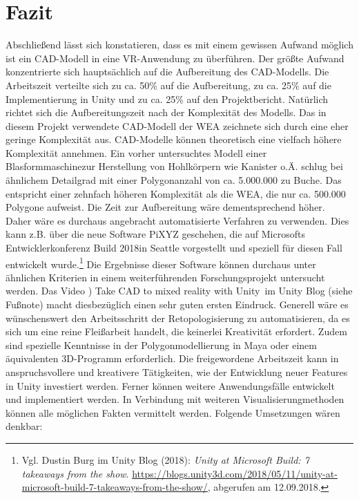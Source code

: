 \chapter{Fazit}
\label{sec:Fazit}

Abschließend lässt sich konstatieren, dass es mit einem gewissen Aufwand möglich ist ein CAD-Modell in eine VR-Anwendung zu überführen. Der größte Aufwand konzentrierte sich hauptsächlich auf die Aufbereitung des CAD-Modells. Die Arbeitszeit verteilte sich zu ca. 50\% auf die Aufbereitung, zu ca. 25\% auf die Implementierung in Unity und zu ca. 25\% auf den Projektbericht. Natürlich richtet sich die Aufbereitungszeit nach der Komplexität des Modells. Das in diesem Projekt verwendete CAD-Modell der WEA zeichnete sich durch eine eher geringe Komplexität aus. CAD-Modelle können theoretisch eine vielfach höhere Komplexität annehmen. 
Ein vorher untersuchtes Modell einer \glqq Blasformmaschine\grqq zur Herstellung von Hohlkörpern wie Kanister o.Ä. schlug bei ähnlichem Detailgrad mit einer Polygonanzahl von ca. 5.000.000 zu Buche. Das entspricht einer zehnfach höheren Komplexität als die WEA, die nur ca. 500.000 Polygone aufweist. Die Zeit zur Aufbereitung wäre dementsprechend höher. Daher wäre es durchaus angebracht automatisierte Verfahren zu verwenden. Dies kann z.B. über die neue Software PiXYZ geschehen, die auf Microsofts Entwicklerkonferenz \glqq Build 2018\grqq in Seattle vorgestellt und speziell für diesen Fall entwickelt wurde.\footnote{Vgl. Dustin Burg im Unity Blog (2018): \textit{Unity at Microsoft Build: 7 takeaways from the show}.\newline
\url{https://blogs.unity3d.com/2018/05/11/unity-at-microsoft-build-7-takeaways-from-the-show/},\newline 
abgerufen am 12.09.2018.} Die Ergebnisse dieser Software können durchaus unter ähnlichen Kriterien in einem weiterführenden Forschungsprojekt untersucht werden. Das Video ) Take CAD to mixed reality with Unity\grqq\, im Unity Blog (siehe Fußnote) macht diesbezüglich einen sehr guten ersten Eindruck. Generell wäre es wünschenswert den Arbeitsschritt der Retopologisierung zu automatisieren, da es sich um eine reine Fleißarbeit handelt, die keinerlei Kreativität erfordert. Zudem sind spezielle Kenntnisse in der Polygonmodellierung in Maya oder einem äquivalenten 3D-Programm erforderlich. Die freigewordene  Arbeitszeit kann in anspruchsvollere und kreativere Tätigkeiten, wie der Entwicklung neuer Features in Unity investiert werden.
Ferner können weitere Anwendungsfälle entwickelt und implementiert werden. In Verbindung mit weiteren Visualisierungmethoden können alle möglichen Fakten vermittelt werden. Folgende Umsetzungen wären denkbar:
